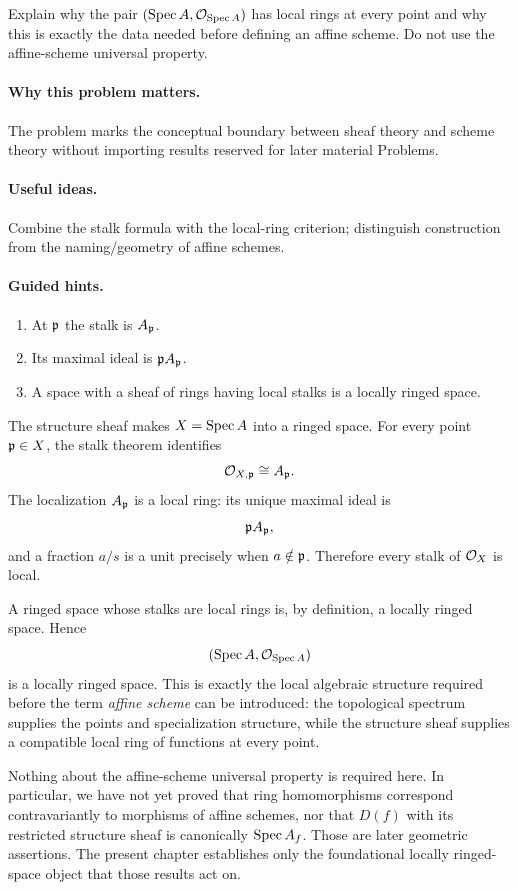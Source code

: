\begin{problem}\label{prob:vi17-p21}
Explain why the pair $(\operatorname{Spec} A,\mathcal O_{\operatorname{Spec} A})$ has local rings at every point and why this is exactly the data needed before defining an affine scheme.  Do not use the affine-scheme universal property.
\end{problem}

\ifdefined\FullProblemDossiers
\paragraph{Why this problem matters.}
The problem marks the conceptual boundary between sheaf theory and scheme theory without importing results reserved for later material Problems.

\paragraph{Useful ideas.}
Combine the stalk formula with the local-ring criterion; distinguish construction from the naming/geometry of affine schemes.

\paragraph{Guided hints.}
\begin{enumerate}
\item At $\mathfrak p$ the stalk is $A_{\mathfrak p}$.
\item Its maximal ideal is $\mathfrak p A_{\mathfrak p}$.
\item A space with a sheaf of rings having local stalks is a locally ringed space.
\end{enumerate}

\begin{solution}
The structure sheaf makes $X=\operatorname{Spec} A$ into a ringed space.  For every point $\mathfrak p\in X$, the stalk theorem identifies
\[
\mathcal O_{X,\mathfrak p}\cong A_{\mathfrak p}.
\]
The localization $A_{\mathfrak p}$ is a local ring: its unique maximal ideal is
\[
\mathfrak p A_{\mathfrak p},
\]
and a fraction $a/s$ is a unit precisely when $a\notin\mathfrak p$.  Therefore every stalk of $\mathcal O_X$ is local.

A ringed space whose stalks are local rings is, by definition, a locally ringed space.  Hence
\[
(\operatorname{Spec} A,\mathcal O_{\operatorname{Spec} A})
\]
is a locally ringed space.  This is exactly the local algebraic structure required before the term \emph{affine scheme} can be introduced: the topological spectrum supplies the points and specialization structure, while the structure sheaf supplies a compatible local ring of functions at every point.

Nothing about the affine-scheme universal property is required here.  In particular, we have not yet proved that ring homomorphisms correspond contravariantly to morphisms of affine schemes, nor that $D(f)$ with its restricted structure sheaf is canonically $\operatorname{Spec} A_f$.  Those are later geometric assertions.  The present chapter establishes only the foundational locally ringed-space object that those results act on.
\end{solution}



